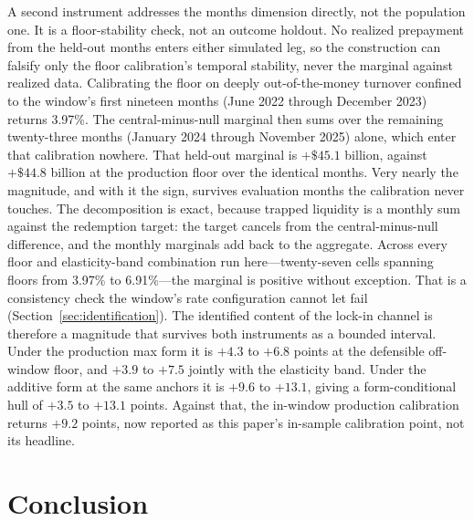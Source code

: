 \documentclass[12pt]{article}
\begin{document}
A second instrument addresses the months dimension directly, not the population one. It is a floor-stability check, not an outcome holdout. No realized prepayment from the held-out months enters either simulated leg, so the construction can falsify only the floor calibration's temporal stability, never the marginal against realized data. Calibrating the floor on deeply out-of-the-money turnover confined to the window's first nineteen months (June 2022 through December 2023) returns 3.97\%. The central-minus-null marginal then sums over the remaining twenty-three months (January 2024 through November 2025) alone, which enter that calibration nowhere. That held-out marginal is $+\$45.1$ billion, against $+\$44.8$ billion at the production floor over the identical months. Very nearly the magnitude, and with it the sign, survives evaluation months the calibration never touches. The decomposition is exact, because trapped liquidity is a monthly sum against the redemption target: the target cancels from the central-minus-null difference, and the monthly marginals add back to the aggregate. Across every floor and elasticity-band combination run here---twenty-seven cells spanning floors from 3.97\% to 6.91\%---the marginal is positive without exception. That is a consistency check the window's rate configuration cannot let fail (Section~\ref{sec:identification}). The identified content of the lock-in channel is therefore a magnitude that survives both instruments as a bounded interval. Under the production max form it is $+4.3$ to $+6.8$ points at the defensible off-window floor, and $+3.9$ to $+7.5$ jointly with the elasticity band. Under the additive form at the same anchors it is $+9.6$ to $+13.1$, giving a form-conditional hull of $+3.5$ to $+13.1$ points. Against that, the in-window production calibration returns $+9.2$ points, now reported as this paper's in-sample calibration point, not its headline.


\section{Conclusion}\label{sec:conclusion}
\end{document}
